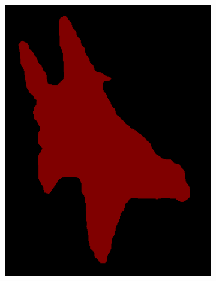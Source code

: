 \documentclass{article} %
\begin{document}
\begin{figure}[t]
\begin{subfigure}[b]{0.19\linewidth}
    \includegraphics[width=\textwidth]{figs/ab/step8_voc/2007_002619}
  \end{subfigure}
  \begin{subfigure}[b]{0.19\linewidth}

\end{subfigure}
\end{figure}
\end{document}
